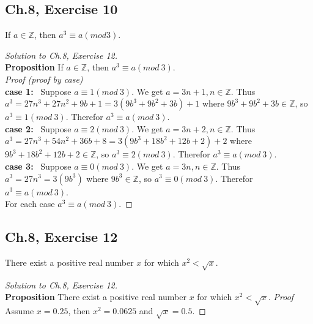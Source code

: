 \documentclass[12pt]{amsart}
\numberwithin{equation}{section}
\theoremstyle{definition}
\theoremstyle{remark}
\begin{document}
\subsection*{Ch.8, Exercise 10} If $ a \in \mathbb{Z} $, then $ a^3 \equiv a (mod 3) $.

\begin{proof}[Solution to Ch.8, Exercise 12]
\ \\
\textbf{Proposition} If $ a \in \mathbb{Z} $, then $ a^3 \equiv a (mod \  3) $.\\
\textit{Proof (proof by case)} \\
\textbf{case 1:} \ Suppose $ a \equiv 1 (mod \ 3) $. We get $ a = 3n + 1, n \in \mathbb{Z} $. Thus $ a^3 = 27n^3 + 27n^2 + 9b + 1 = 3 (9b^3 + 9b^2 + 3b) + 1 $ where $ 9b^3 + 9b^2 + 3b \in \mathbb{Z} $, so $ a^3 \equiv 1 (mod \ 3) $. Therefor $ a^3 \equiv a (mod \ 3) $.\\
\textbf{case 2:} \ Suppose $ a \equiv 2 (mod \ 3) $. We get $ a = 3n + 2, n \in \mathbb{Z} $. Thus $ a^3 = 27n^3 + 54n^2 + 36b + 8 = 3 (9b^3 + 18b^2 + 12b + 2) + 2 $ where $ 9b^3 + 18b^2 + 12b + 2 \in \mathbb{Z} $, so $ a^3 \equiv 2 (mod \ 3) $. Therefor $ a^3 \equiv a (mod \ 3) $.\\
\textbf{case 3:} \ Suppose $ a \equiv 0 (mod \ 3) $. We get $ a = 3n, n \in \mathbb{Z} $. Thus $ a^3 = 27n^3 = 3 (9b^3) $ where $ 9b^3 \in \mathbb{Z} $, so $ a^3 \equiv 0 (mod \ 3) $. Therefor $ a^3 \equiv a (mod \ 3) $.\\
For each case $ a^3 \equiv a (mod \ 3) $.
\end{proof}




\subsection*{Ch.8, Exercise 12}  There exist a positive real number $ x $ for which $ x^2 < \sqrt{x} $.

\begin{proof}[Solution to Ch.8, Exercise 12]
\ \\
\textbf{Proposition} There exist a positive real number $ x $ for which $ x^2 < \sqrt{x} $.
\textit{Proof} Assume $ x = 0.25 $, then $ x^2 = 0.0625 $ and $ \sqrt{x} = 0.5 $.

\end{proof}


\end{document}
